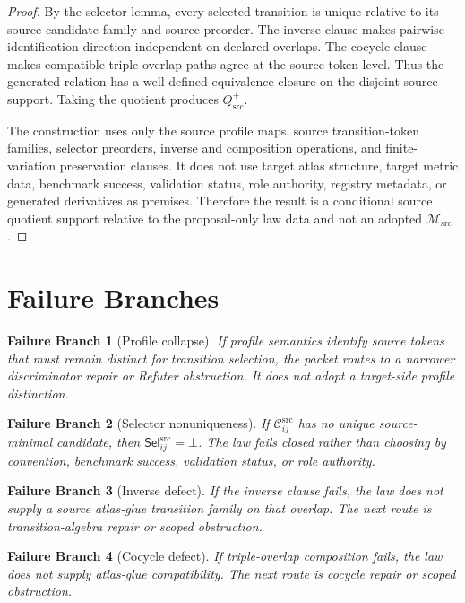 \documentclass[11pt]{article}
\newcommand{\Msrc}{\mathcal{M}_{\mathrm{src}}}
\newcommand{\Cand}{\mathcal{C}^{\mathrm{src}}}
\newcommand{\Sel}{\mathsf{Sel}^{\mathrm{src}}}
\newcommand{\Qsrc}{Q_{\mathrm{src}}^{+}}
\newcommand{\Bot}{\bot}
\newtheorem{failure}{Failure Branch}
\begin{document}
\begin{proof}
By the selector lemma, every selected transition is unique relative to its
source candidate family and source preorder. The inverse clause makes pairwise
identification direction-independent on declared overlaps. The cocycle clause
makes compatible triple-overlap paths agree at the source-token level. Thus
the generated relation has a well-defined equivalence closure on the disjoint
source support. Taking the quotient produces \(\Qsrc\).

The construction uses only the source profile maps, source transition-token
families, selector preorders, inverse and composition operations, and
finite-variation preservation clauses. It does not use target atlas structure,
target metric data, benchmark success, validation status, role authority,
registry metadata, or generated derivatives as premises. Therefore the result
is a conditional source quotient support relative to the proposal-only law
data and not an adopted \(\Msrc\).
\end{proof}

\section{Failure Branches}

\begin{failure}[Profile collapse]
If profile semantics identify source tokens that must remain distinct for
transition selection, the packet routes to a narrower discriminator repair or
Refuter obstruction. It does not adopt a target-side profile distinction.
\end{failure}

\begin{failure}[Selector nonuniqueness]
If \(\Cand_{ij}\) has no unique source-minimal candidate, then
\(\Sel_{ij}=\Bot\). The law fails closed rather than choosing by convention,
benchmark success, validation status, or role authority.
\end{failure}

\begin{failure}[Inverse defect]
If the inverse clause fails, the law does not supply a source atlas-glue
transition family on that overlap. The next route is transition-algebra repair
or scoped obstruction.
\end{failure}

\begin{failure}[Cocycle defect]
If triple-overlap composition fails, the law does not supply atlas-glue
compatibility. The next route is cocycle repair or scoped obstruction.
\end{failure}
\end{document}
